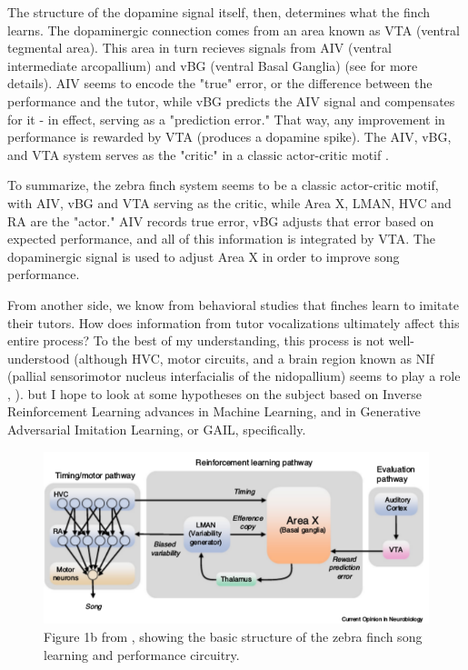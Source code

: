 \documentclass[aps,prl,preprint,groupedaddress]{revtex4-1}
\begin{document}
The structure of the dopamine signal itself, then, determines what the finch learns. 
The dopaminergic connection comes from an area known as VTA (ventral tegmental area). 
This area in turn recieves signals from AIV (ventral intermediate arcopallium) and vBG (ventral Basal Ganglia) (see \cite{jesseactorcritic} for more details). 
AIV seems to encode the "true" error, or the difference between the performance and the tutor, 
while vBG predicts the AIV signal and compensates for it - in effect, serving as a "prediction error." 
That way, any improvement in performance is rewarded by VTA (produces a dopamine spike). 
The AIV, vBG, and VTA system serves as the "critic" in a classic actor-critic motif \cite{jesseactorcritic}.

To summarize, the zebra finch system seems to be a classic actor-critic motif, 
with AIV, vBG and VTA serving as the critic, while Area X, LMAN, HVC and RA are the "actor." 
AIV records true error, vBG adjusts that error based on expected performance, and all of this information is integrated by VTA. 
The dopaminergic signal is used to adjust Area X in order to improve song performance.

From another side, we know from behavioral studies that finches learn to imitate their tutors. 
How does information from tutor vocalizations ultimately affect this entire process? 
To the best of my understanding, this process is not well-understood 
(although HVC, motor circuits, and a brain region known as NIf (pallial sensorimotor nucleus interfacialis of the nidopallium) 
seems to play a role \cite{nifmem}, \cite{hvcmem}).
but I hope to look at some hypotheses on the subject based on Inverse Reinforcement Learning advances in Machine Learning, 
and in Generative Adversarial Imitation Learning, or GAIL, specifically.

\begin{figure}[h]
   \centering
   \includegraphics[width=1.0\textwidth]{jqfigs/HVC_fig1b.pdf}
   \caption{\label{fig1b} Figure 1b from \cite{hvcchains}, showing the basic structure of the zebra finch song learning and performance circuitry.}
\end{figure}
\end{document}

